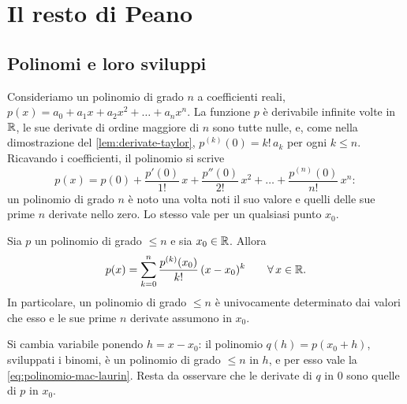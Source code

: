 \section{Il resto di Peano}
\label{sec:taylor-peano}

\subsection{Polinomi e loro sviluppi}

Consideriamo un polinomio di grado $n$ a coefficienti reali,
$p(x)=a_{0}+a_{1}x+a_{2}x^{2}+\dots+a_{n}x^{n}$. La funzione $p$ è derivabile infinite volte in
$\mathbb{R}$, le sue derivate di ordine maggiore di $n$ sono tutte nulle, e, come nella
dimostrazione del \cref{lem:derivate-taylor}, $p^{(k)}(0)=k!\,a_{k}$ per ogni $k\le n$.
Ricavando i coefficienti, il polinomio si scrive
\begin{equation}\label{eq:polinomio-mac-laurin}
  p(x)=p(0)+\frac{p'(0)}{1!}\,x+\frac{p''(0)}{2!}\,x^{2}+\dots+\frac{p^{(n)}(0)}{n!}\,x^{n} :
\end{equation}
un polinomio di grado $n$ è noto una volta noti il suo valore e quelli delle sue prime
$n$ derivate nello zero. Lo stesso vale per un qualsiasi punto $x_{0}$.

\begin{proposizione}
\label{prop:polinomio-sviluppo}
Sia $p$ un polinomio di grado $\le n$ e sia $x_{0}\in\mathbb{R}$. Allora
\begin{equation}\label{eq:polinomio-sviluppo}
  p(x)=\sum_{k=0}^{n}\frac{p^{(k)}(x_{0})}{k!}\,(x-x_{0})^{k} \qquad\forall\, x\in\mathbb{R} .
\end{equation}
In particolare, un polinomio di grado $\le n$ è univocamente determinato dai valori che
esso e le sue prime $n$ derivate assumono in $x_{0}$.
\end{proposizione}

\begin{schema}
\end{schema}

\begin{strategia}
Si cambia variabile ponendo $h=x-x_{0}$: il polinomio $q(h)=p(x_{0}+h)$, sviluppati i
binomi, è un polinomio di grado $\le n$ in $h$, e per esso vale la
\eqref{eq:polinomio-mac-laurin}. Resta da osservare che le derivate di $q$ in $0$ sono quelle
di $p$ in $x_{0}$.
\end{strategia}

